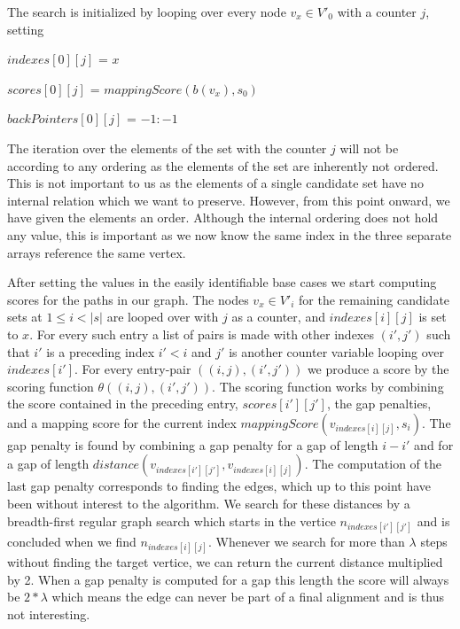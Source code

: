 \documentclass[thesis.tex]{subfiles}
\begin{document}
The search is initialized by looping over every node $v_x \in V'_0$ with a counter $j$, setting\\
\par
$indexes[0][j]$ = $x$\par
$scores[0][j]$ = $mappingScore(b(v_x), s_0)$\par
$backPointers[0][j]$ = $-1:-1$\\
\par\noindent
The iteration over the elements of the set with the counter $j$ will not be according to any ordering as the elements of the set are inherently not ordered. This is not important to us as the elements of a single candidate set have no internal relation which we want to preserve. However, from this point onward, we have given the elements an order. Although the internal ordering does not hold any value, this is important as we now know the same index in the three separate arrays reference the same vertex.\\
\par\noindent
After setting the values in the easily identifiable base cases we start computing scores for the paths in our graph. The nodes $v_x \in V'_i$ for the remaining candidate sets at $1 \leq i < |s|$ are looped over with $j$ as a counter, and $indexes[i][j]$ is set to $x$. For every such entry a list of pairs is made with other indexes $(i', j')$ such that $i'$ is a preceding index $i'<i$ and $j'$ is another counter variable looping over $indexes[i']$. For every entry-pair $((i, j), (i', j'))$ we produce a score by the scoring function $\theta((i, j), (i', j'))$. The scoring function works by combining the score contained in the preceding entry, $scores[i'][j']$, the gap penalties, and a mapping score for the current index $mappingScore(v_{indexes[i][j]}, s_i)$. The gap penalty is found by combining a gap penalty for a gap of length $i-i'$ and for a gap of length $distance(v_{indexes[i'][j']}, v_{indexes[i][j]})$. The computation of the last gap penalty corresponds to finding the edges, which up to this point have been without interest to the algorithm. We search for these distances by a breadth-first regular graph search which starts in the vertice $n_{indexes[i'][j']}$ and is concluded when we find $n_{indexes[i][j]}$. Whenever we search for more than $\lambda$ steps without finding the target vertice, we can return the current distance multiplied by 2. When a gap penalty is computed for a gap this length the score will always be $2*\lambda$ which means the edge can never be part of a final alignment and is thus not interesting. \\
\end{document}
